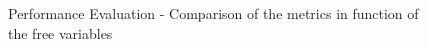 \begin{center}
\begin{figure}[htb]
\begin{subfigure}[t]{0.45\textwidth}
		\end{subfigure}
		\caption{Performance Evaluation - Comparison of the metrics in function of the free variables}
		\label{fig:performace-graphs}
	\end{figure}
\end{center}
